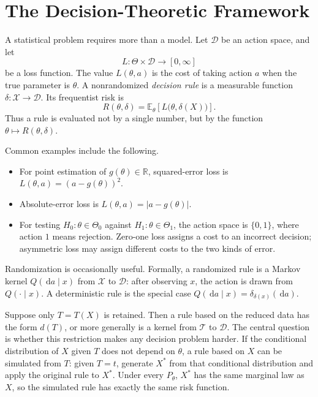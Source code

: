 \documentclass[12pt,oneside]{book}
\numberwithin{equation}{section}
\theoremstyle{definition}
\theoremstyle{plain}
\theoremstyle{remark}
\newcommand{\R}{\mathbb{R}}
\newcommand{\E}{\mathbb{E}}
\newcommand{\abs}[1]{\left\lvert #1 \right\rvert}
\newcommand{\dd}{\,\mathrm{d}}
\begin{document}
\section{The Decision-Theoretic Framework}

A statistical problem requires more than a model.  Let $\mathcal D$ be an
action space, and let
\[
    L:\Theta\times\mathcal D\longrightarrow[0,\infty]
\]
be a loss function.  The value $L(\theta,a)$ is the cost of taking action $a$
when the true parameter is $\theta$.  A nonrandomized \emph{decision rule} is
a measurable function $\delta:\mathcal X\to\mathcal D$.  Its frequentist risk
is
\begin{equation}
    R(\theta,\delta)
    =\E_\theta\!\left[L\bigl(\theta,\delta(X)\bigr)\right].
    \label{eq:risk-definition}
\end{equation}
Thus a rule is evaluated not by a single number, but by the function
$\theta\mapsto R(\theta,\delta)$.

Common examples include the following.
\begin{itemize}
    \item For point estimation of $g(\theta)\in\R$, squared-error loss is
    $L(\theta,a)=(a-g(\theta))^2$.
    \item Absolute-error loss is $L(\theta,a)=\abs{a-g(\theta)}$.
    \item For testing $H_0:\theta\in\Theta_0$ against
    $H_1:\theta\in\Theta_1$, the action space is $\{0,1\}$, where action $1$
    means rejection.  Zero-one loss assigns a cost to an incorrect decision;
    asymmetric loss may assign different costs to the two kinds of error.
\end{itemize}

Randomization is occasionally useful.  Formally, a randomized rule is a
Markov kernel $Q(\dd a\mid x)$ from $\mathcal X$ to $\mathcal D$: after
observing $x$, the action is drawn from $Q(\cdot\mid x)$.  A deterministic
rule is the special case $Q(\dd a\mid x)=\delta_{\delta(x)}(\dd a)$.

Suppose only $T=T(X)$ is retained.  Then a rule based on the reduced data has
the form $d(T)$, or more generally is a kernel from $\mathcal T$ to
$\mathcal D$.  The central question is whether this restriction makes any
decision problem harder.  If the conditional distribution of $X$ given $T$
does not depend on $\theta$, a rule based on $X$ can be simulated from $T$:
given $T=t$, generate $X^*$ from that conditional distribution and apply the
original rule to $X^*$.  Under every $P_\theta$, $X^*$ has the same marginal
law as $X$, so the simulated rule has exactly the same risk function.
\end{document}
